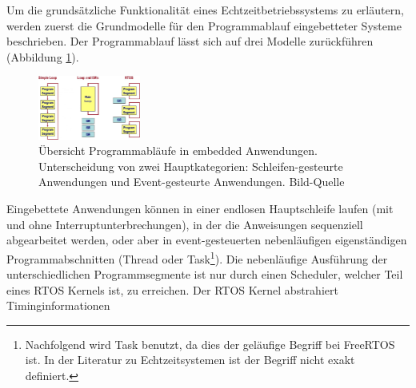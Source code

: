 Um die grund\-sätz\-liche Funktionalität eines Echtzeitbetriebssystems zu erläutern, werden zuerst die Grundmodelle für den Programmablauf eingebetteter Systeme beschrieben. Der Programmablauf lässt sich auf drei Modelle zu\-rück\-füh\-ren\cite{RTOSRevealed} (Abbildung \ref{fig:Programmablauf}). 
\begin{figure}[ht]
	\centering
		\includegraphics[width=0.3\textwidth]{Pictures/EmbeddedCom/cwrtos2f5c.jpg}
	\caption{Übersicht Programmabläufe in embedded Anwendungen. Unterscheidung von zwei Hauptkategorien: Schleifen-gesteurte Anwendungen und Event-gesteurte Anwendungen. Bild-Quelle~\protect{}}
	\label{fig:Programmablauf}
\end{figure}
Eingebettete Anwendungen können in einer endlosen Hauptschleife laufen (mit und ohne Interruptunterbrechungen), in der die Anweisungen sequenziell abgearbeitet werden, oder aber in event-gesteuerten ne\-ben\-läuf\-igen ei\-gen\-stän\-dig\-en Pro\-gramm\-ab\-schnit\-ten (Thre\-ad oder Task\footnote{Nachfolgend wird Task benutzt, da dies der geläufige Begriff bei FreeRTOS ist. In der Literatur zu Echtzeitsystemen ist der Begriff nicht exakt definiert.}). Die ne\-ben\-läuf\-ige Aus\-füh\-rung der unterschiedlichen Programmsegmente ist nur durch einen Scheduler, welcher Teil eines RTOS Kernels ist, zu erreichen. Der RTOS Kernel abstrahiert Timinginformationen\cite{MasteringFreeRtos} 
